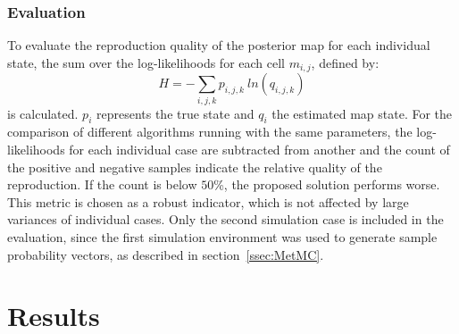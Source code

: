 \documentclass[twocolumn,letterpaper]{IEEEAerospaceCLS}  %
\begin{document}
\subsubsection{Evaluation}\label{ssec:MetEval}
To evaluate the reproduction quality of the posterior map for each individual state, the sum over the log-likelihoods for each cell $m_{i,j}$, defined by:
\begin{equation} \label{eq:Entropy}
    H = - \sum_{i,j,k} p_{i,j,k}~ln(q_{i,j,k})
\end{equation}
is calculated. $p_i$ represents the true state and $q_i$ the estimated map state.
For the comparison of different algorithms running with the same parameters, the log-likelihoods for each individual case are subtracted from another and the count of the positive and negative samples indicate the relative quality of the reproduction. If the count is below $50$\%, the proposed solution performs worse. This metric is chosen as a robust indicator, which is not affected by large variances of individual cases. 
Only the second simulation case is included in the evaluation, since the first simulation environment was used to generate sample probability vectors, as described in section~\ref{ssec:MetMC}.
\section{Results} \label{sec:Res}
\end{document}
